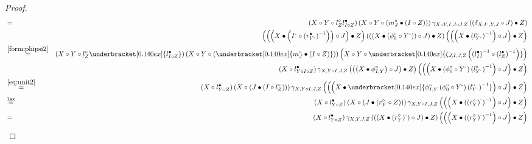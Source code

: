 \documentclass[nosumlimits,twoside]{amsart}
\theoremstyle{definition}
\theoremstyle{remark}
\def\revsn{\text{-}}
\begin{document}
\begin{proof}
\begin{eqnarray*}
&=&
\left( X\circ Y\circ l_{Z}^{\circ }l_{I\circ Z}^{\bullet }\right) \left(
X\circ Y\circ \left( m_{J}^{\circ }\bullet \left( I\circ Z\right) \right)
\right) \gamma _{X\circ Y,I,J\circ J,Z}\left( \left( \delta _{X,I^{\revsn%
},Y,J}\circ J\right) \bullet Z\right)  \\
&&\left( \left( \left( X\bullet \left( I^{\revsn}\circ \left( r_{Y^{\revsn%
}}^{\bullet }\right) ^{-1}\right) \right) \circ J\right) \bullet Z\right)
\left( \left( \left( X\bullet \left( \phi _{0}^{\circ }\circ Y^{\revsn%
}\right) \right) \circ J\right) \bullet Z\right) \left( \left( \left(
X\bullet \left( l_{Y^{\revsn}}^{\circ }\right) ^{-1}\right) \circ J\right)
\bullet Z\right)\\
&\overset{\eqref{form:phipsi2}}{=}&
\left( X\circ Y\circ l_{Z}^{\circ }\underbracket[0.140ex]{l_{I\circ
Z}^{\bullet }}\right) \left( X\circ Y\circ \left( %
\underbracket[0.140ex]{m_{J}^{\circ }\bullet \left( I\circ Z\right) }\right)
\right) \left( X\circ Y\circ \underbracket[0.140ex]{\zeta _{J,I,J,Z}\left(
\left( l_{I}^{\bullet }\right) ^{-1}\circ \left( l_{Z}^{\bullet }\right)
^{-1}\right) }\right)  \\
&&\left( X\circ l_{Y\circ I\circ Z}^{\bullet }\right) \gamma _{X,Y\circ
I,J, Z}\left( \left( \left( X\bullet \phi _{I,Y}^{\circ }\right) \circ J\right)
\bullet Z\right) \left( \left( \left( X\bullet \left( \phi _{0}^{\circ
}\circ Y^{\revsn}\right) \left( l_{Y^{\revsn}}^{\circ }\right) ^{-1}\right)
\circ J\right) \bullet Z\right)\\
&\overset{\eqref{eq:unit2}}{=}&\left( X\circ l_{Y\circ Z}^{\bullet }\right) \left( X\circ \left(
J\bullet \left( I\circ l_{Z}^{\circ }\right) \right) \right) \gamma
_{X,Y\circ I,J,Z}\left( \left( \left( X\bullet \underbracket[0.140ex]{\phi
_{I,Y}^{\circ }\left(\phi _{0}^{\circ }\circ Y^{\revsn }\right)\left( l_{Y^{%
\revsn}}^{\circ }\right) ^{-1}}\right) \circ J\right) \bullet Z\right)  \\
&\overset{\mathtt{lax}}{=}&\left( X\circ l_{Y\circ Z}^{\bullet }\right)
\left( X\circ \left( J\bullet \left( r_{Y}^{\circ }\circ Z\right) \right)
\right) \gamma _{X,Y\circ I,J,Z}\left( \left( \left( X\bullet \left( \left(
r_{Y}^{\circ }\right) ^{\revsn}\right) ^{-1}\right) \circ J\right) \bullet Z\right)
\\
&=&\left( X\circ l_{Y\circ Z}^{\bullet }\right) \gamma _{X,Y,J,Z}\left(
\left( \left( X\bullet \left( r_{Y}^{\circ }\right) ^{\revsn}\right) \circ
J\right) \bullet Z\right) \left( \left( \left( X\bullet \left( \left(
r^{\circ }_{Y}\right) ^{\revsn}\right) ^{-1}\right) \circ J\right) \bullet Z\right)

\end{eqnarray*}
\end{proof}
\end{document}
